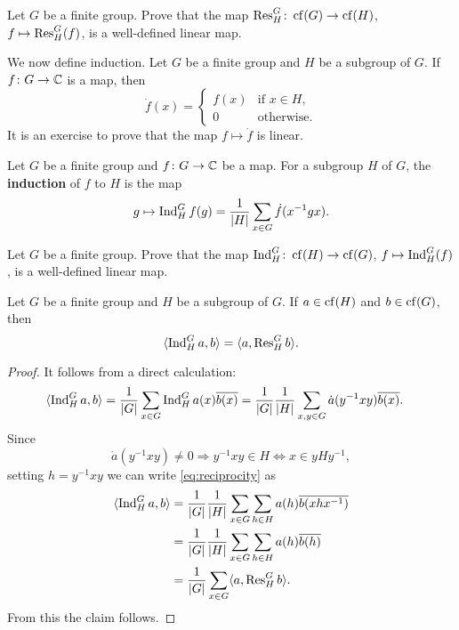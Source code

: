 \begin{exercise}
\label{xca:restriction}
    Let $G$ be a finite group. Prove that
    the map $\operatorname{Res}_H^G\colon\operatorname{cf}(G)\to\operatorname{cf}(H)$, $f\mapsto\operatorname{Res}_H^G(f)$, 
    is a well-defined linear map. 
\end{exercise}

We now define induction. Let $G$ be a finite group
and $H$ be a subgroup of $G$. If $f\colon G\to\mathbb{C}$ is a map, 
then 
\[
\dot{f}(x)=\begin{cases}
    f(x) & \text{if $x\in H$},\\
    0 & \text{otherwise}.
    \end{cases}
\]
It is an exercise to prove that
the map $f\mapsto\dot{f}$ is linear. 

\begin{definition}
    Let $G$ be a finite group and $f\colon G\to\mathbb{C}$ be
    a map. For a subgroup $H$ of $G$, the \textbf{induction}
    of $f$ to $H$ is the map 
    \begin{align*}
      g\mapsto\operatorname{Ind}_H^Gf(g)=\frac{1}{|H|}\sum_{x\in G}\dot{f}(x^{-1}gx).
    \end{align*}
\end{definition}

\begin{exercise}
\label{xca:induction}
    Let $G$ be a finite group. Prove that
    the map $\operatorname{Ind}_H^G\colon\operatorname{cf}(H)\to\operatorname{cf}(G)$, $f\mapsto\operatorname{Ind}_H^G(f)$, 
    is a well-defined linear map. 
\end{exercise}

\begin{theorem}
    Let $G$ be a finite group and $H$ be a subgroup of $G$. 
    If $a\in\operatorname{cf}(H)$ and $b\in\operatorname{cf}(G)$, then
    \[
    \langle\operatorname{Ind}_H^Ga,b\rangle=\langle a,\operatorname{Res}_H^Gb\rangle.
    \]
\end{theorem}

\begin{proof}
    It follows from a direct calculation:
    \begin{equation}
    \label{eq:reciprocity}
    \begin{aligned}
        \langle\operatorname{Ind}_H^Ga,b\rangle 
        &= \frac{1}{|G|}\sum_{x\in G}\operatorname{Ind}_H^Ga(x)\overline{b(x)}
        = \frac{1}{|G|}\frac{1}{|H|}\sum_{x,y\in G}\dot{a}(y^{-1}xy)\overline{b(x)}.
    \end{aligned}
    \end{equation}
    Since 
    \[
    \dot{a}(y^{-1}xy)\ne 0\Longrightarrow
    y^{-1}xy\in H\Longleftrightarrow x\in yHy^{-1},
    \]
    setting $h=y^{-1}xy$ 
    we can write \eqref{eq:reciprocity} as 
    \begin{align*}
        \langle\operatorname{Ind}_H^Ga,b\rangle
        &=\frac{1}{|G|}\frac{1}{|H|}\sum_{x\in G}\sum_{h\in H}a(h)\overline{b(xhx^{-1})}\\
        &=\frac{1}{|G|}\frac{1}{|H|}\sum_{x\in G}\sum_{h\in H}a(h)\overline{b(h)}\\
        &=\frac{1}{|G|}\sum_{x\in G}\langle a,\operatorname{Res}_H^Gb\rangle.
    \end{align*}
    From this the claim follows. 
\end{proof}

